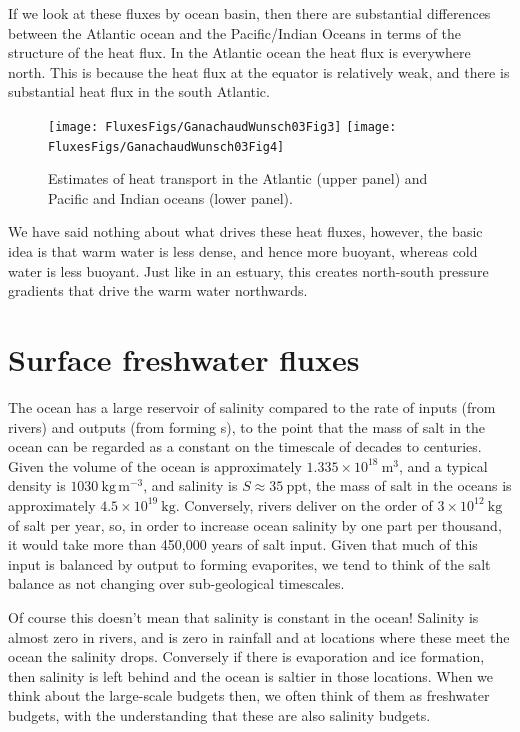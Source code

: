 If we look at these fluxes by ocean basin, then there are substantial differences between the Atlantic ocean and the Pacific/Indian Oceans in terms of the structure of the heat flux.  In the Atlantic ocean the heat flux is everywhere north.  This is because the heat flux at the equator is relatively weak, and there is substantial heat flux in the south Atlantic.  


\begin{figure}
\begin{center}
\texttt{[image: FluxesFigs/GanachaudWunsch03Fig3]}
\texttt{[image: FluxesFigs/GanachaudWunsch03Fig4]}
 \caption{Estimates of heat transport in the Atlantic (upper panel) and Pacific and Indian oceans (lower panel)\citep{ganachaudwunsch03}.}
  \label{fig:GanachaudWunsch03Fig3_4}
\end{center}
\end{figure}

We have said nothing about what drives these heat fluxes, however, the basic idea is that warm water is less dense, and hence more buoyant, whereas cold water is less buoyant.  Just like in an estuary, this creates north-south pressure gradients that drive the warm water northwards.  


\section{Surface freshwater fluxes}

The ocean has a large reservoir of salinity compared to the rate of inputs (from rivers) and outputs (from forming s), to the point that the mass of salt in the ocean can be regarded as a constant on the timescale of decades to centuries.  Given the volume of the ocean is approximately $1.335\times10^{18}\ \mathrm{m^3}$, and a typical density is $1030\ \mathrm{kg\,m^{-3}}$, and salinity is $S\approx35 \ \mathrm{ppt}$, the mass of salt in the oceans is approximately $4.5\times10^{19} \ \mathrm{kg}$.  Conversely, rivers deliver on the order of  $3\times10^{12} \ \mathrm{kg}$ of salt per year, so, in order to increase ocean salinity by one part per thousand, it would take more than 450,000 years of salt input.  Given that much of this input is balanced by output to forming evaporites, we tend to think of the salt balance as not changing over sub-geological timescales.  

Of course this doesn't mean that salinity is constant in the ocean!  Salinity is almost zero in rivers, and is zero in rainfall and at locations where these meet the ocean the salinity drops.  Conversely if there is evaporation and ice formation, then salinity is left behind and the ocean is saltier in those locations.  When we think about the large-scale budgets then, we often think of them as freshwater budgets, with the understanding that these are also salinity budgets.  


